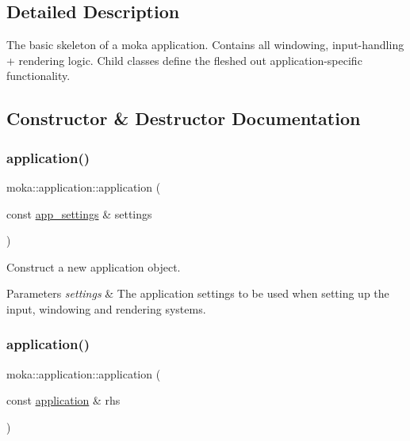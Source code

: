 \subsection{Detailed Description}
The basic skeleton of a moka application. Contains all windowing, input-\/handling + rendering logic. Child classes define the fleshed out application-\/specific functionality. 

\subsection{Constructor \& Destructor Documentation}
\mbox{\label{classmoka_1_1application_ae33bd647d6f1405304d2a499ecc3177a}} 
\subsubsection{\texorpdfstring{application()}{application()}\hspace{0.1cm}{\footnotesize\ttfamily [1/3]}}
{\footnotesize\ttfamily moka\+::application\+::application (\begin{DoxyParamCaption}\item[{const \mbox{\hyperlink{structmoka_1_1app__settings}{app\+\_\+settings}} \&}]{settings }\end{DoxyParamCaption})\hspace{0.3cm}{\ttfamily [explicit]}}



Construct a new application object. 


\begin{DoxyParams}{Parameters}
{\em settings} & The application settings to be used when setting up the input, windowing and rendering systems. \\
\hline
\end{DoxyParams}
\mbox{\label{classmoka_1_1application_a7fd533f69ba906c8bfb6ffd5ebb72652}} 
\subsubsection{\texorpdfstring{application()}{application()}\hspace{0.1cm}{\footnotesize\ttfamily [2/3]}}
{\footnotesize\ttfamily moka\+::application\+::application (\begin{DoxyParamCaption}\item[{const \mbox{\hyperlink{classmoka_1_1application}{application}} \&}]{rhs }\end{DoxyParamCaption})\hspace{0.3cm}{\ttfamily [delete]}}

